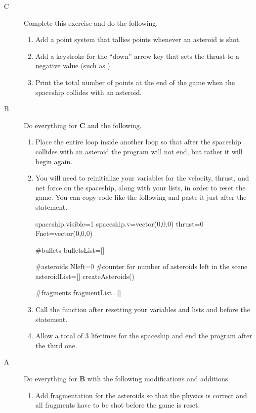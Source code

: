 \begin{description}

\item[C] Complete this exercise and do the following.

\begin{enumerate}
	\item Add a point system that tallies points whenever an asteroid is shot.
	\item Add a keystroke for the ``down'' arrow key that sets the thrust to a negative value (such as ).
	\item Print the total number of points at the end of the game when the spaceship collides with an asteroid.
\end{enumerate}


\item[B] Do everything for {\bf C} and the following.

\begin{enumerate}
	\item Place the entire  loop inside another  loop so that after the spaceship collides with an asteroid the program will not end, but rather it will begin again.
	\item You will need to reinitialize your variables for the velocity, thrust, and net force on the spaceship, along with your lists, in order to reset the game. You can copy code like the following and paste it just after the  statement.
	
\begin{myvpython}
spaceship.visible=1
spaceship.v=vector(0,0,0)
thrust=0
Fnet=vector(0,0,0)

#bullets
bulletsList=[]

#asteroids
Nleft=0 #counter for number of asteroids left in the scene
asteroidList=[]
createAsteroids()

#fragments
fragmentList=[]
\end{myvpython}

	\item Call the  function after resetting your variables and lists and before the  statement.
	
	\item Allow a total of 3 lifetimes for the spaceship and end the program after the third one.

\end{enumerate}

\item[A] Do everything for {\bf B} with the following modifications and additions.

\begin{enumerate}
	\item Add fragmentation for the asteroids so that the physics is correct and all fragments have to be shot before the game is reset.
\end{enumerate}




\end{description}

